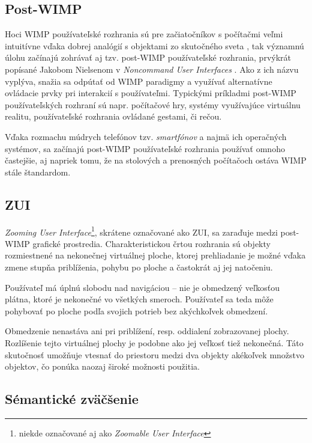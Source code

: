 \subsection{Post-WIMP}

Hoci WIMP používateľské rozhrania sú pre začiatočníkov s počítačmi veľmi intuitívne vďaka dobrej analógií s objektami zo skutočného sveta \cite{antimac_ui}, tak významnú úlohu začínajú zohrávať aj tzv. post-WIMP používateľské rozhrania, prvýkrát popísané Jakobom Nielsenom v \textit{Noncommand User Interfaces} \cite{noncmd_ui}. Ako z ich názvu vyplýva, snažia sa odpútať od WIMP paradigmy a využívať alternatívne ovládacie prvky pri interakcií s používateľmi. Typickými príkladmi post-WIMP používateľských rozhraní sú napr. počítačové hry, systémy využívajúce virtuálnu realitu, používateľské rozhrania ovládané gestami, či rečou.

Vďaka rozmachu múdrych telefónov tzv. \textit{smartfónov} a najmä ich operačných systémov, sa začínajú post-WIMP používateľské rozhrania používať omnoho častejšie, aj napriek tomu, že na stolových a prenosných počítačoch ostáva WIMP stále štandardom.

\subsection{ZUI}

\textit{Zooming User Interface}\footnote{niekde označované aj ako \textit{Zoomable User Interface}}, skrátene označované ako ZUI, sa zaraďuje medzi post-WIMP grafické prostredia. Charakteristickou črtou rozhrania sú objekty rozmiestnené na nekonečnej virtuálnej ploche, ktorej prehliadanie je možné vďaka zmene stupňa priblíženia, pohybu po ploche a častokrát aj jej natočeniu.

Používateľ má úplnú slobodu nad navigáciou -- nie je obmedzený veľkosťou plátna, ktoré je nekonečné vo všetkých smeroch. Používateľ sa teda môže pohybovať po ploche podľa svojich potrieb bez akýchkoľvek obmedzení.

Obmedzenie nenastáva ani pri priblížení, resp. oddialení zobrazovanej plochy. Rozlíšenie tejto virtuálnej plochy je podobne ako jej veľkosť tiež nekonečná. Táto skutočnosť umožňuje vtesnať do priestoru medzi dva objekty akékoľvek množstvo objektov, čo ponúka naozaj široké možnosti použitia.

\subsection{Sémantické zväčšenie} \label{sec:semantic-zoom}

